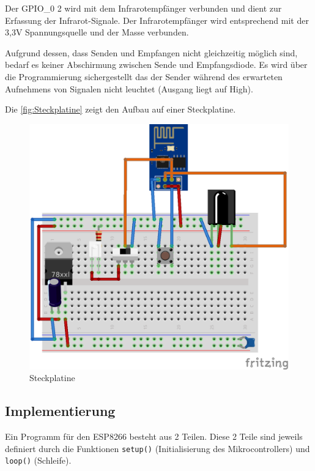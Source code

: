 Der \acs{GPIO}\_0 2 wird mit dem Infrarotempfänger verbunden und dient zur Erfassung der Infrarot-Signale.
Der Infrarotempfänger wird entsprechend mit der 3,3V Spannungsquelle und der Masse verbunden.

Aufgrund dessen, dass Senden und Empfangen nicht gleichzeitig möglich sind, bedarf es keiner Abschirmung zwischen Sende und Empfangsdiode. Es wird über die Programmierung sichergestellt das der Sender während des erwarteten Aufnehmens von Signalen nicht leuchtet (Ausgang liegt auf High).

Die \autoref{fig:Steckplatine} zeigt den Aufbau auf einer Steckplatine.

\begin{figure}
	\centering
	\includegraphics[scale=1]{Abbildungen/ESP8266_Steckplatine}
	\caption{Steckplatine}
	\label{fig:Steckplatine}
\end{figure}



\subsection{Implementierung}
Ein Programm für den ESP8266 besteht aus 2 Teilen.
Diese 2 Teile sind jeweils definiert durch die Funktionen \texttt{setup()} (Initialisierung des Mikrocontrollers) und \texttt{loop()} (Schleife).

